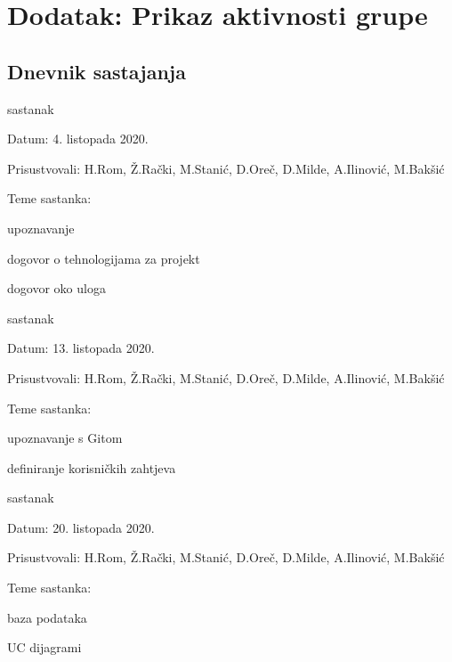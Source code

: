 \chapter*{Dodatak: Prikaz aktivnosti grupe}
		
		\section*{Dnevnik sastajanja}
		
	
				
		\begin{packed_enum}
			\item  sastanak
			
			\item[] \begin{packed_item}
				\item Datum: 4. listopada 2020.
				\item Prisustvovali: H.Rom, Ž.Rački, M.Stanić, D.Oreč, D.Milde, A.Ilinović, M.Bakšić
				\item Teme sastanka:
				\begin{packed_item}
					\item  upoznavanje
					\item  dogovor o tehnologijama za projekt
					\item  dogovor oko uloga
				\end{packed_item}
			\end{packed_item}
			
			\item  sastanak 
			\item[] \begin{packed_item}
				\item Datum: 13. listopada 2020.
				\item Prisustvovali: H.Rom, Ž.Rački, M.Stanić, D.Oreč, D.Milde, A.Ilinović, M.Bakšić
				\item Teme sastanka:
				\begin{packed_item}
					\item  upoznavanje s Gitom
					\item  definiranje korisničkih zahtjeva
				\end{packed_item}
			\end{packed_item}
		
		    \item  sastanak 
		    \item[] \begin{packed_item}
		    	\item Datum: 20. listopada 2020.
		    	\item Prisustvovali: H.Rom, Ž.Rački, M.Stanić, D.Oreč, D.Milde, A.Ilinović, M.Bakšić
		    	\item Teme sastanka:
		    	\begin{packed_item}
		    		\item  baza podataka
		    		\item  UC dijagrami
		    	\end{packed_item}
		    \end{packed_item}
	    

\end{packed_enum}
